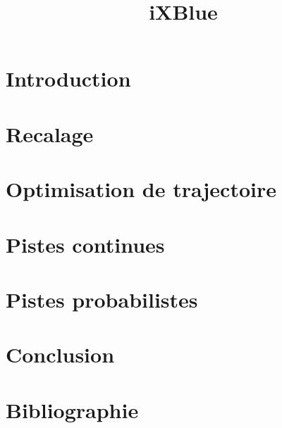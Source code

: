 \documentclass[11pt,oneside]{article}
\title{iXBlue}
\author{}
\date{}
\begin{document}
\maketitle
\setcounter{tocdepth}{1}
\tableofcontents

\section{Introduction}

\section{Recalage}
\section{Optimisation de trajectoire}

\section{Pistes continues}

\section{Pistes probabilistes}

\section{Conclusion}
\section{Bibliographie}
\end{document}
